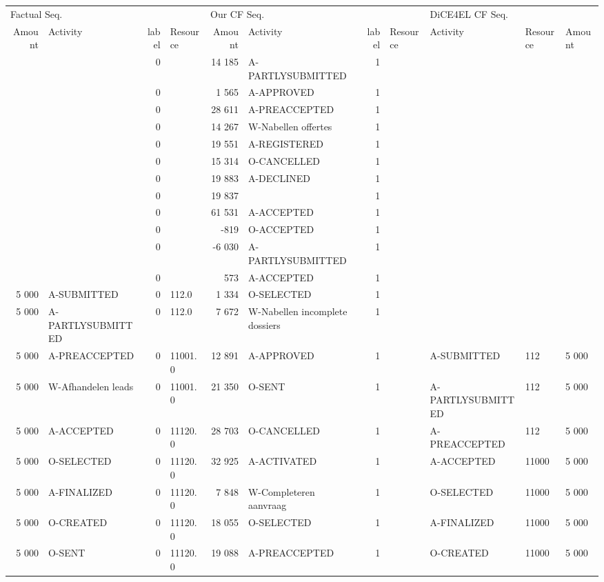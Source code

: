 \begin{tabular}{rlrlrlrllll}
\toprule
\multicolumn{4}{l}{Factual Seq.} & \multicolumn{4}{l}{Our CF Seq.} & \multicolumn{3}{l}{DiCE4EL CF Seq.} \\
Amount & Activity & label & Resource & Amount & Activity & label & Resource & Activity & Resource & Amount \\
\midrule
 &  & 0 &  & 14 185 & A-PARTLYSUBMITTED & 1 &  &  &  &  \\
 &  & 0 &  & 1 565 & A-APPROVED & 1 &  &  &  &  \\
 &  & 0 &  & 28 611 & A-PREACCEPTED & 1 &  &  &  &  \\
 &  & 0 &  & 14 267 & W-Nabellen offertes & 1 &  &  &  &  \\
 &  & 0 &  & 19 551 & A-REGISTERED & 1 &  &  &  &  \\
 &  & 0 &  & 15 314 & O-CANCELLED & 1 &  &  &  &  \\
 &  & 0 &  & 19 883 & A-DECLINED & 1 &  &  &  &  \\
 &  & 0 &  & 19 837 &  & 1 &  &  &  &  \\
 &  & 0 &  & 61 531 & A-ACCEPTED & 1 &  &  &  &  \\
 &  & 0 &  & -819 & O-ACCEPTED & 1 &  &  &  &  \\
 &  & 0 &  & -6 030 & A-PARTLYSUBMITTED & 1 &  &  &  &  \\
 &  & 0 &  & 573 & A-ACCEPTED & 1 &  &  &  &  \\
5 000 & A-SUBMITTED & 0 & 112.0 & 1 334 & O-SELECTED & 1 &  &  &  &  \\
5 000 & A-PARTLYSUBMITTED & 0 & 112.0 & 7 672 & W-Nabellen incomplete dossiers & 1 &  &  &  &  \\
5 000 & A-PREACCEPTED & 0 & 11001.0 & 12 891 & A-APPROVED & 1 &  & A-SUBMITTED & 112 & 5 000 \\
5 000 & W-Afhandelen leads & 0 & 11001.0 & 21 350 & O-SENT & 1 &  & A-PARTLYSUBMITTED & 112 & 5 000 \\
5 000 & A-ACCEPTED & 0 & 11120.0 & 28 703 & O-CANCELLED & 1 &  & A-PREACCEPTED & 112 & 5 000 \\
5 000 & O-SELECTED & 0 & 11120.0 & 32 925 & A-ACTIVATED & 1 &  & A-ACCEPTED & 11000 & 5 000 \\
5 000 & A-FINALIZED & 0 & 11120.0 & 7 848 & W-Completeren aanvraag & 1 &  & O-SELECTED & 11000 & 5 000 \\
5 000 & O-CREATED & 0 & 11120.0 & 18 055 & O-SELECTED & 1 &  & A-FINALIZED & 11000 & 5 000 \\
5 000 & O-SENT & 0 & 11120.0 & 19 088 & A-PREACCEPTED & 1 &  & O-CREATED & 11000 & 5 000 \\

\end{tabular}
